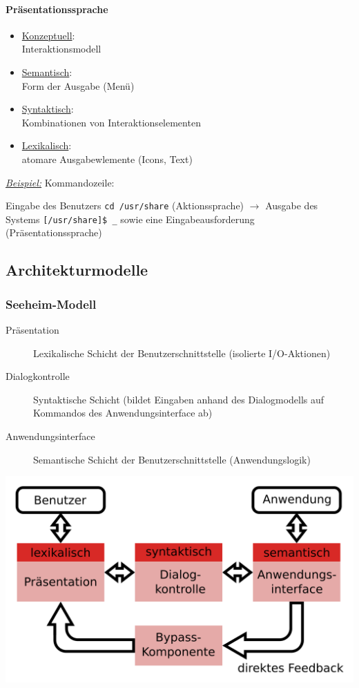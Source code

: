 \documentclass
[
	8pt,		%
	ngerman,	%
	a4paper,	%
	landscape,	%
	final		%
]{extarticle}
\newcommand{\example}{\textit{\underline{Beispiel:} }}
\begin{document}
\begin{multicols*}{4}
{\begin{multicols*}{2}
			\paragraph{Präsentationssprache}
			\begin{itemize}
				\item \underline{Konzeptuell}:\\
				      Interaktionsmodell
				\item \underline{Semantisch}:\\
				      Form der Ausgabe (Menü)
				\item \underline{Syntaktisch}:\\
				      Kombinationen von Interaktionselementen
				\item \underline{Lexikalisch}:\\
				      atomare Ausgabewlemente (Icons, Text)
			\end{itemize}
		\end{multicols*}
	}
	\example Kommandozeile: \par
	Eingabe des Benutzers \texttt{cd /usr/share} (Aktionssprache) \(\rightarrow\)
	Ausgabe des Systems \texttt{[/usr/share]\$ \_} sowie eine
	Eingabeausforderung (Präsentationssprache)
	\subsection{Architekturmodelle}
	\subsubsection{Seeheim-Modell}
	\begin{description}
		\item[Präsentation] Lexikalische Schicht der Benutzerschnittstelle
		      (isolierte I/O-Aktionen)
		\item[Dialogkontrolle] Syntaktische Schicht (bildet Eingaben anhand des
		      Dialogmodells auf Kommandos des Anwendungsinterface ab)
		\item[Anwendungsinterface] Semantische Schicht der Benutzerschnittstelle
		      (Anwendungslogik)
	\end{description}
	\begin{center}
		\includegraphics[width=0.7\linewidth]{./pictures/figure_04.png}
	\end{center}

\end{multicols*}
\end{document}
